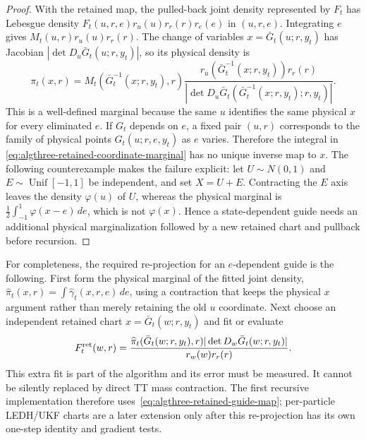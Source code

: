 \documentclass[11pt]{article}
\begin{document}
\begin{proof}
With the retained map, the pulled-back joint density represented by $F_t$ has
Lebesgue density
$F_t(u,r,e)r_u(u)r_r(r)r_e(e)$ in $(u,r,e)$.  Integrating $e$ gives
$M_t(u,r)r_u(u)r_r(r)$.  The change of variables
$x=\bar G_t(u;r,y_t)$ has Jacobian
$|\det D_u\bar G_t(u;r,y_t)|$, so its physical density is
\begin{equation*}
  \pi_t(x,r)=M_t(\bar G_t^{-1}(x;r,y_t),r)
  \frac{r_u(\bar G_t^{-1}(x;r,y_t))r_r(r)}
       {|\det D_u\bar G_t(\bar G_t^{-1}(x;r,y_t);r,y_t)|}.
\end{equation*}
This is a well-defined marginal because the same $u$ identifies the same
physical $x$ for every eliminated $e$.  If $G_t$ depends on $e$, a fixed pair
$(u,r)$ corresponds to the family of physical points
$G_t(u;r,e,y_t)$ as $e$ varies.  Therefore the integral in
\eqref{eq:algthree-retained-coordinate-marginal} has no unique inverse map to
$x$.  The following counterexample makes the failure explicit: let
$U\sim N(0,1)$ and $E\sim\operatorname{Unif}[-1,1]$ be independent, and set
$X=U+E$.  Contracting the $E$ axis leaves the density $\varphi(u)$ of $U$,
whereas the physical marginal is
$\frac12\int_{-1}^{1}\varphi(x-e)\,de$, which is not $\varphi(x)$.
Hence a state-dependent guide needs an additional physical marginalization
followed by a new retained chart and pullback before recursion.
\end{proof}

For completeness, the required re-projection for an $e$-dependent guide is
the following.  First form the physical marginal of the fitted joint density,
$\widehat\pi_t(x,r)=\int\widehat\gamma_t(x,r,e)\,de$, using a contraction that
keeps the physical $x$ argument rather than merely retaining the old $u$
coordinate.  Next choose an independent retained chart
$x=\bar G_t(w;r,y_t)$ and fit or evaluate
\begin{equation}
 F_t^{\rm ret}(w,r)=
 \frac{\widehat\pi_t(\bar G_t(w;r,y_t),r)
       |\det D_w\bar G_t(w;r,y_t)|}
      {r_w(w)r_r(r)}.
 \label{eq:algthree-retained-reprojection}
\end{equation}
This extra fit is part of the algorithm and its error must be measured.  It
cannot be silently replaced by direct TT mass contraction.  The first
recursive implementation therefore uses~\eqref{eq:algthree-retained-guide-map};
per-particle LEDH/UKF charts are a later extension only after this re-projection
has its own one-step identity and gradient tests.
\end{document}
